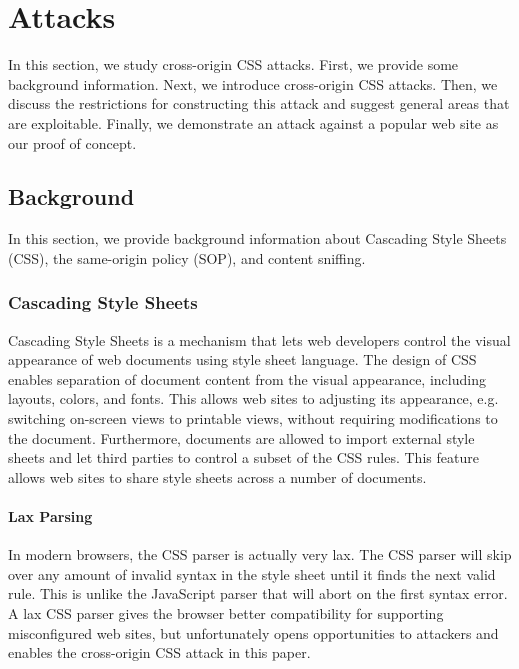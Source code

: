 \documentclass{acm_proc_article-sp}
\begin{document}
\section{Attacks}
In this section, we study cross-origin CSS attacks. First, we provide some background information. Next, we introduce cross-origin CSS attacks. Then, we discuss the restrictions for constructing this attack and suggest general areas that are exploitable. Finally, we demonstrate an attack against a popular web site as our proof of concept.

\subsection{Background}
In this section, we provide background information about Cascading Style Sheets (CSS), the same-origin policy (SOP), and content sniffing.

\subsubsection{Cascading Style Sheets}
Cascading Style Sheets\cite{css} is a mechanism that lets web developers control the visual appearance of web documents using style sheet language. The design of CSS enables separation of document content from the visual appearance, including layouts, colors, and fonts. This allows web sites to adjusting its appearance, e.g. switching on-screen views to printable views, without requiring modifications to the document. Furthermore, documents are allowed to import external style sheets and let third parties to control a subset of the CSS rules. This feature allows web sites to share style sheets across a number of documents.

\paragraph{Lax Parsing}
In modern browsers, the CSS parser is actually very lax. The CSS parser will skip over any amount of invalid syntax in the style sheet until it finds the next valid rule. This is unlike the JavaScript parser that will abort on the first syntax error. A lax CSS parser gives the browser better compatibility for supporting misconfigured web sites, but unfortunately opens opportunities to attackers and enables the cross-origin CSS attack in this paper.
\end{document}
